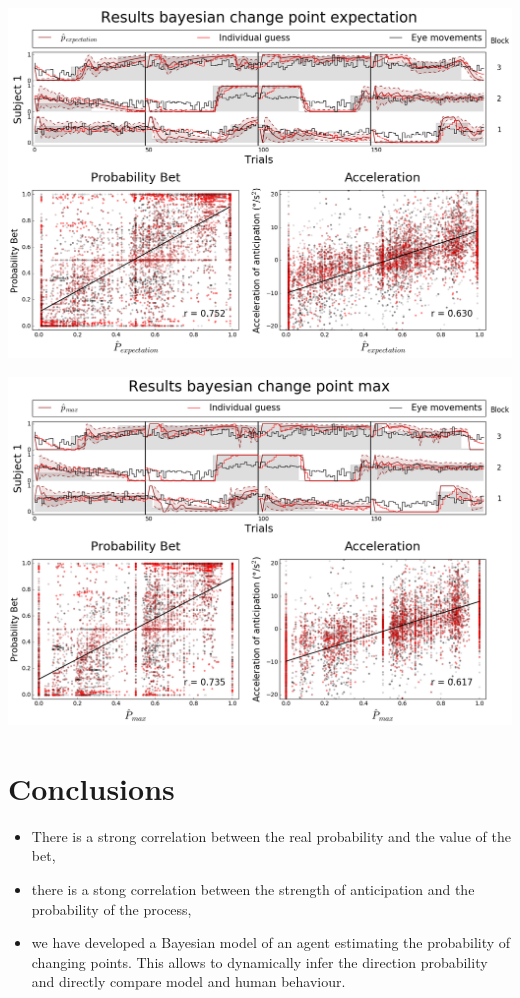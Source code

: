 \documentclass[profile,final,english, draft]{article}%
\begin{document}
\begin{center} 
    \includegraphics[width=1\linewidth]{results_bayesianchangepoint_e}
\end{center}

\begin{center} 
    \includegraphics[width=1\linewidth]{results_bayesianchangepoint_m}
\end{center}



\section*{Conclusions}


\begin{itemize}\setlength{\itemsep}{0ex}
\item There is a strong correlation between the real probability and the value of the bet,

\item there is a stong correlation between the strength of anticipation and the probability of the process,

\item we have developed a Bayesian model of an agent estimating the probability of changing points. This allows to dynamically infer the direction probability and directly compare model and human behaviour.

\end{itemize}

{\tiny
\printbibliography
}
\end{document}
